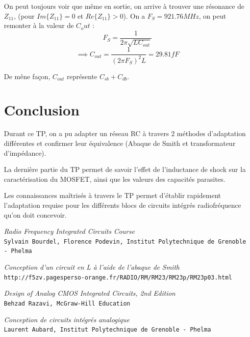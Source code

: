 \documentclass[a4paper]{article}
\begin{document}
On peut toujours voir que m\^eme en sortie, on arrive \`a trouver une r\'esonance de $Z_{11}$,
(pour $Im\{Z_{11}\} = 0 $ et $Re\{Z_{11}\} > 0$).
On a $F_S = 921.76 MHz$, on peut remonter \`a la valeur de $C_out$ :
\[
  F_S = \frac{1}{2\pi \sqrt{LC_{out}}}
\]
\[
  \implies C_{out} = \frac{1}{(2\pi F_S)^2 L} = 29.81 fF
\]

De m\^ene fa\c con, $C_{out}$ repr\'esente $C_{sb} + C_{db}$.

\clearpage

\section*{Conclusion}

Durant ce TP, on a pu adapter un r\'eseau RC \`a travers 2 m\'ethodes d'adaptation diff\'erentes
et confirmer leur \'equivalence (Abaque de Smith et transformateur d'imp\'edance).

La derni\`ere partie du TP permet de savoir l'effet de l'inductance de shock sur la caract\'erisation
du MOSFET, ainsi que les valeurs des capacit\'es parasites.

Les connaissances ma\^itris\'es \`a travers le TP permet d'\'etablir rapidement l'adaptation requise
pour les diff\'erents blocs de circuits int\'egr\'es radiofr\'equence qu'on doit concevoir.




\begin{thebibliography}{9}

\textit{Radio Frequency Integrated Circuits Course}\\
\texttt{Sylvain Bourdel, Florence Podevin, Institut Polytechnique de Grenoble - Phelma}

\textit{Conception d'un circuit en L \`a l'aide de l'abaque de Smith}\\
\texttt{http://f5zv.pagesperso-orange.fr/RADIO/RM/RM23/RM23p/RM23p03.html}

\textit{Design of Analog CMOS Integrated Circuits, 2nd Edition}\\
\texttt{Behzad Razavi, McGraw-Hill Education}

\textit{Conception de circuits int\'egr\'es analogique}\\
\texttt{Laurent Aubard, Institut Polytechnique de Grenoble - Phelma}

\end{thebibliography}
\end{document}
